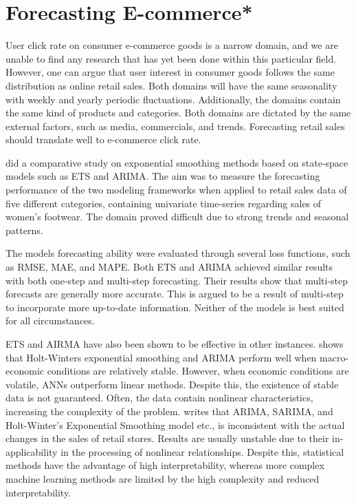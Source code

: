 \section{Forecasting E-commerce*}
\label{section:RelatedWork:forecasting-ecommerce}

User click rate on consumer e-commerce goods is a narrow domain,
and we are unable to find any research that has yet been done within this particular field.
However, one can argue that user interest in consumer goods follows the same distribution
as online retail sales.
Both domains will have the same seasonality with weekly and yearly periodic fluctuations.
Additionally, the domains contain the same kind of products and categories.
Both domains are dictated by the same external factors, such as media, commercials,
and trends.
Forecasting retail sales should translate well to e-commerce click rate.


\cite{Ramos2015} did a comparative study on exponential smoothing methods
based on state-space models such as ETS and ARIMA.
The aim was to measure the forecasting performance of the two modeling frameworks
when applied to retail sales data of five different categories,
containing univariate time-series regarding sales of women's footwear.
The domain proved difficult due to strong trends and seasonal patterns.

The models forecasting ability were evaluated through several loss functions, such as RMSE, MAE, and MAPE.
Both ETS and ARIMA achieved similar results with both one-step and multi-step forecasting.
Their results show that multi-step forecasts are generally more accurate.
This is argued to be a result of multi-step to incorporate more up-to-date information.
Neither of the models is best suited for all circumstances.



ETS and AIRMA have also been shown to be effective in other instances.
\cite{Chu2003} shows that Holt-Winters exponential smoothing and ARIMA perform well when macro-economic
conditions are relatively stable.
However, when economic conditions are volatile, ANNs outperform linear methods.
Despite this, the existence of stable data is not guaranteed.
Often, the data contain nonlinear characteristics, increasing the complexity of the problem.
\cite{Weng2020} writes that ARIMA, SARIMA, and Holt-Winter's
Exponential Smoothing model etc., is inconsistent with the actual changes in the sales
of retail stores.
Results are usually unstable due to their in-applicability
in the processing of nonlinear relationships.
Despite this, statistical methods have the advantage of high interpretability,
whereas more complex machine learning methods are limited by the high complexity and reduced interpretability.




